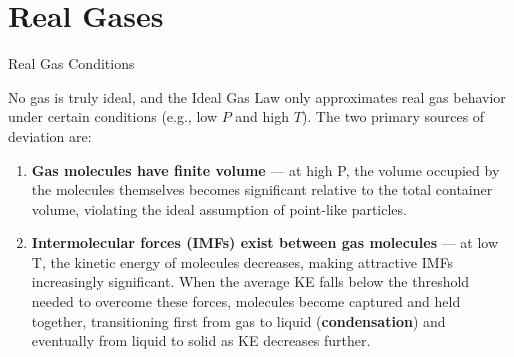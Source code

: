 \documentclass[10pt]{article}
\begin{document}
\section{Real Gases}

  \begin{core}{Real Gas Conditions}

    No gas is truly ideal, and the Ideal Gas Law only approximates real gas behavior under certain conditions (e.g., low $P$ and high $T$). The two primary sources of deviation are:

    \begin{enumerate}

      \item \textbf{Gas molecules have finite volume} --- at high P, the volume occupied by the molecules themselves becomes significant relative to the total container volume, violating the ideal assumption of point-like particles.

      \item \textbf{Intermolecular forces (IMFs) exist between gas molecules} --- at low T, the kinetic energy of molecules decreases, making attractive IMFs increasingly significant. When the average KE falls below the threshold needed to overcome these forces, molecules become captured and held together, transitioning first from gas to liquid (\textbf{condensation}) and eventually from liquid to solid as KE decreases further.
        
    \end{enumerate}

\end{core}
\end{document}
